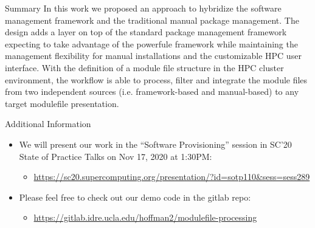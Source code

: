 \documentclass[final]{beamer}
\newlength{\onecolwid}
\begin{document}
\begin{frame}[t]
\begin{columns}[t]
\begin{column}{\onecolwid}
\begin{block}{Summary}
In this work we proposed an approach to hybridize the software management framework and the traditional manual package management. 
The design adds a layer on top of the standard package management framework expecting to take advantage of the powerfule framework while maintaining the management flexibility for manual installations and the customizable HPC user interface. 
With the definition of a module file structure in the HPC cluster environment, the workflow is able to process, filter and integrate the module files from two independent sources (i.e. framework-based and manual-based) to any target modulefile presentation. 

\end{block}


\begin{block}{Additional Information}

\setlength{\leftmarginii}{2.5cm}
\begin{itemize}
\item We will present our work in the ``Software Provisioning'' session in SC'20 State of Practice Talks on Nov 17, 2020 at 1:30PM:
    \begin{itemize}
        \item \href{https://sc20.supercomputing.org/presentation/?id=sotp110\&sess=sess289}{https://sc20.supercomputing.org/presentation/?id=sotp110\&sess=sess289}
    \end{itemize}
\vspace{0.5em}
\item Please feel free to check out our demo code in the gitlab repo:
    \begin{itemize}
        \item \href{https://gitlab.idre.ucla.edu/hoffman2/modulefile-processing}{https://gitlab.idre.ucla.edu/hoffman2/modulefile-processing}
    \end{itemize}
\end{itemize}

\end{block}



\end{column}
\end{columns}
\end{frame}
\end{document}
